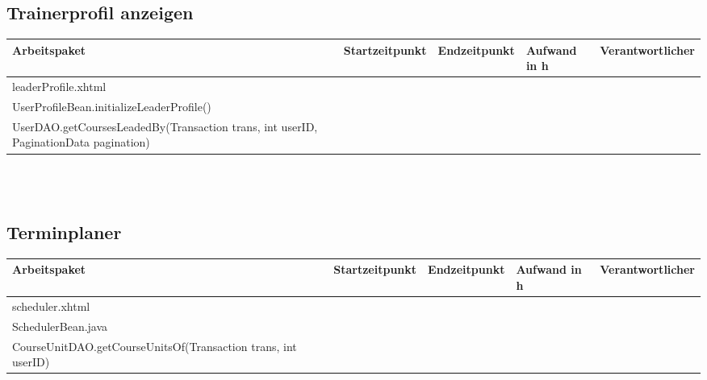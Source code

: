 \begin{landscape}
	\subsection{Trainerprofil anzeigen}	
	\begin{tabular}{|p{10cm}|p{4cm}|p{3cm}|p{3cm}|p{3cm}|}
		\hline  \textbf{Arbeitspaket} & \textbf{Startzeitpunkt} & \textbf{Endzeitpunkt} & \textbf{Aufwand in h} & \textbf{Verantwortlicher} \\ 
		\hline   leaderProfile.xhtml                      &                            &                             &                     &\\
		\hline   UserProfileBean.initializeLeaderProfile()&                            &                             &                     &\\
		\hline   UserDAO.getCoursesLeadedBy(Transaction trans, int userID, PaginationData pagination)  &                            &                             &                     &\\
		\hline 
	\end{tabular} \ \\
	\ \\
	
	\subsection{Terminplaner}
	\begin{tabular}{|p{10cm}|p{4cm}|p{3cm}|p{3cm}|p{3cm}|}
		\hline  \textbf{Arbeitspaket} & \textbf{Startzeitpunkt} & \textbf{Endzeitpunkt} & \textbf{Aufwand in h} & \textbf{Verantwortlicher} \\ 
		\hline   scheduler.xhtml                                 &                            &                             &                     &\\
		\hline   SchedulerBean.java                              &                            &                             &                     &\\
		\hline   CourseUnitDAO.getCourseUnitsOf(Transaction trans, int userID)  &                            &                             &                     &\\
		\hline 
	\end{tabular} \ \\
	\ \\
	

\end{landscape}
